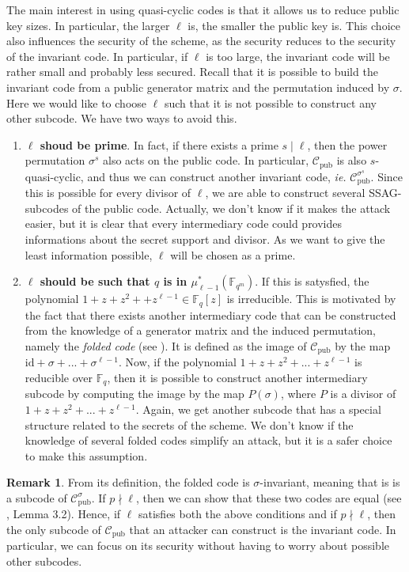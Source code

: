 \documentclass[10pt]{article}
\theoremstyle{definition}
\newtheorem{rq1}[thm]{Remark}
\theoremstyle{definition}
\theoremstyle{definition}
\newcommand{\C}{\mathcal{C}}
\newcommand{\fqm}{\mathbb{F}_{q^m}}
\newcommand{\fq}{\mathbb{F}_q}
\begin{document}
The main interest in using quasi-cyclic codes is that it allows us to reduce public key sizes. In particular, the larger $\ell$ is, the smaller the public key is. This choice also influences the security of the scheme, as the security reduces to the security of the invariant code. In particular, if $\ell$ is too large, the invariant code will be rather small and probably less secured. Recall that it is possible to build the invariant code from a public generator matrix and the permutation induced by $\sigma$. Here we would like to choose $\ell$ such that it is not possible to construct any other subcode. We have two ways to avoid this.

\begin{enumerate}
\item \textbf{$\ell$ shoud be prime}. In fact, if there exists a prime $s \mid \ell$, then the power permutation $\sigma^s$ also acts on the public code. In particular, $\C_{\textrm{pub}}$ is also $s$-quasi-cyclic, and thus we can construct another invariant code, \textit{ie.} $\C_{\textrm{pub}}^{\sigma^s}$. Since this is possible for every divisor of $\ell$, we are able to construct several SSAG-subcodes of the public code. Actually, we don't know if it makes the attack easier, but it is clear that every intermediary code could provides informations about the secret support and divisor. As we want to give the least information possible, $\ell$ will be chosen as a prime.

\item \textbf{$\ell$ should be such that $q$ is in $\mu_{\ell -1}^*(\fqm)$}. If this is satysfied, the polynomial $1+z+z^2++z^{\ell-1} \in \fq[z]$ is irreducible. This is motivated by the fact that there exists another intermediary code that can be constructed from the knowledge of a generator matrix and the induced permutation, namely the \textit{folded code} (see \cite{FOP}). It is defined as the image of $\C_{\textrm{pub}}$ by the map $\mathrm{id} +\sigma+...+\sigma^{\ell-1}$. Now, if the polynomial $1+z+z^2+...+z^{\ell-1}$ is reducible over $\fq$, then it is possible to construct another intermediary subcode by computing the image by the map $P(\sigma)$, where $P$ is a divisor of $1+z+z^2+...+z^{\ell-1}$. Again, we get another subcode that has a special structure related to the secrets of the scheme. We don't know if the knowledge of several folded codes simplify an attack, but it is a safer choice to make this assumption.
\end{enumerate}

\begin{rq1} \label{un seul subcode} 
From its definition, the folded code is $\sigma$-invariant, meaning that is is a subcode of $\C_{\mathrm{pub}}^{\sigma}$. If $p \nmid \ell$, then we can show that these two codes are equal (see \cite{Bar1} , Lemma 3.2). Hence, if $\ell$ satisfies both the above conditions and if $p \nmid \ell$, then the only subcode of $\mathcal{C}_{\mathrm{pub}}$ that an attacker can construct is the invariant code. In particular, we can focus on its security without having to worry about possible other subcodes.  
\end{rq1}
\end{document}
